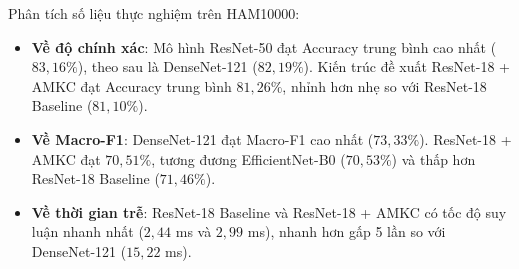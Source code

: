 \begin{table}[htbp]
\centering
\caption{Kết quả đối sánh các mô hình trên tập kiểm thử HAM10000 (TTA, 3 seeds: $42, 123, 2026$)}
\label{tab:ham10000_results}
\small
\setlength{\tabcolsep}{4pt}
\end{table}

Phân tích số liệu thực nghiệm trên HAM10000:
\begin{itemize}
  \item \textbf{Về độ chính xác}: Mô hình ResNet-50 đạt Accuracy trung bình cao nhất ($83{,}16\%$), theo sau là DenseNet-121 ($82{,}19\%$). Kiến trúc đề xuất ResNet-18 + AMKC đạt Accuracy trung bình $81{,}26\%$, nhỉnh hơn nhẹ so với ResNet-18 Baseline ($81{,}10\%$).
  \item \textbf{Về Macro-F1}: DenseNet-121 đạt Macro-F1 cao nhất ($73{,}33\%$). ResNet-18 + AMKC đạt $70{,}51\%$, tương đương EfficientNet-B0 ($70{,}53\%$) và thấp hơn ResNet-18 Baseline ($71{,}46\%$).
  \item \textbf{Về thời gian trễ}: ResNet-18 Baseline và ResNet-18 + AMKC có tốc độ suy luận nhanh nhất ($2{,}44$ ms và $2{,}99$ ms), nhanh hơn gấp 5 lần so với DenseNet-121 ($15{,}22$ ms).
\end{itemize}

